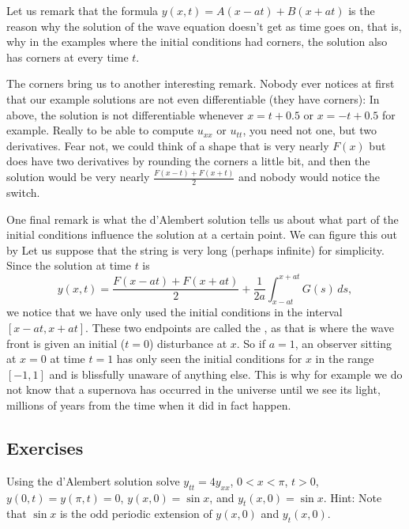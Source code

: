 Let us remark that the formula $y(x,t) = A(x-at) + B(x+at)$ is the reason
why the solution of the wave equation doesn't get  as time
goes on, that is, why in the examples where the initial conditions
had corners, the solution also has corners at every time $t$.

\medskip

The corners bring us to another interesting remark.  Nobody ever notices at first
that our example solutions are not even differentiable (they have corners):
In  above, the solution is not
differentiable whenever $x=t+0.5$ or $x=-t+0.5$ for example.
Really to be able to compute $u_{xx}$ or $u_{tt}$, you need not one, but two
derivatives.  Fear not, we could think of a shape that is very nearly
$F(x)$ but does have two derivatives by rounding the corners a little bit,
and then the solution would be very nearly
$\frac{F(x-t)+F(x+t)}{2}$ and nobody would notice the switch.

\medskip

One final remark is what the d'Alembert solution tells us about what
part of the initial conditions influence the solution at a certain point.
We can figure this out by   Let us suppose that the string is very long (perhaps
infinite) for simplicity.  Since the solution at time $t$ is
\begin{equation*}
y(x,t) =
\frac{F(x-at) + F(x+at)}{2} + \frac{1}{2a} \int_{x-at}^{x+at} G(s) \,ds ,
\end{equation*}
we notice that we have only used the initial conditions in the interval
$[x-at,x+at]$.  These two endpoints are called the
\emph{}, as that is where the wave front is given an
initial ($t=0$) disturbance at $x$.
So if $a=1$, an observer sitting at $x=0$ at time $t=1$ has only seen the
initial conditions for $x$ in the range $[-1,1]$
and is blissfully unaware of anything else.
This is why for example we do not know that a supernova has occurred in the
universe until we see its light, millions of years from the time
when it did in fact happen.

\subsection{Exercises}

\begin{exercise}
Using the d'Alembert solution solve $y_{tt} = 4y_{xx}$, $0 < x < \pi$, $t >
0$,
$y(0,t) = y(\pi, t) = 0$, $y(x,0) = \sin x$, and
$y_t(x,0) = \sin x$.  Hint: Note that $\sin x$ is the odd periodic extension of
$y(x,0)$ and $y_t(x,0)$.
\end{exercise}


